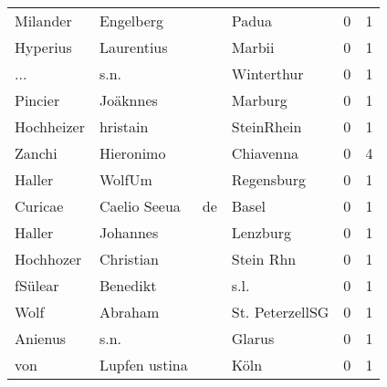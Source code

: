 \begin{tabular}{llllrr}
                 Milander &                          Engelberg &             &                                       Padua &          0 &         1 \\
                 Hyperius &                         Laurentius &             &                                      Marbii &          0 &         1 \\
                      ... &                               s.n. &             &                                  Winterthur &          0 &         1 \\
                  Pincier &                           Joäknnes &             &                                     Marburg &          0 &         1 \\
               Hochheizer &                           hristain &             &                                  SteinRhein &          0 &         1 \\
                   Zanchi &                          Hieronimo &             &                                   Chiavenna &          0 &         4 \\
                   Haller &                             WolfUm &             &                                  Regensburg &          0 &         1 \\
                  Curicae &                       Caelio Seeua &          de &                                       Basel &          0 &         1 \\
                   Haller &                           Johannes &             &                                    Lenzburg &          0 &         1 \\
                Hochhozer &                          Christian &             &                                   Stein Rhn &          0 &         1 \\
                  fSülear &                           Benedikt &             &                                        s.l. &          0 &         1 \\
                     Wolf &                            Abraham &             &                             St. PeterzellSG &          0 &         1 \\
                  Anienus &                               s.n. &             &                                      Glarus &          0 &         1 \\
                      von &                      Lupfen ustina &             &                                        Köln &          0 &         1 \\

\end{tabular}
